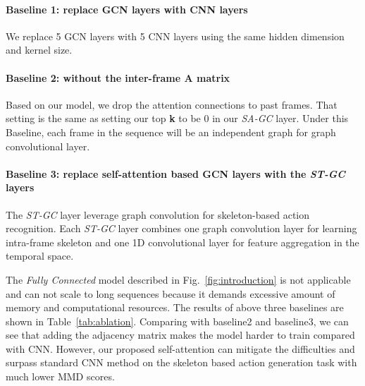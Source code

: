 \documentclass[runningheads]{llncs}
\begin{document}
\paragraph{Baseline 1: replace GCN layers with CNN layers}
We replace 5 GCN layers with 5 CNN layers using the same hidden dimension and kernel size. 

\paragraph{Baseline 2: without the inter-frame A matrix}
Based on our model, we drop the attention connections to past frames. That setting is the same as setting our top \textbf{k} to be 0 in our {\it SA-GC} layer. Under this Baseline, each frame in the sequence will be an independent graph for graph convolutional layer.  

\paragraph{Baseline 3: replace self-attention based GCN layers with the {\it ST-GC} layers \cite{yan2018spatial}}

The {\it ST-GC} layer leverage graph convolution for skeleton-based action recognition. Each {\it ST-GC} layer combines one graph convolution layer for learning intra-frame skeleton and one 1D convolutional layer for feature aggregation in the temporal space. 


The {\it Fully Connected} model described in Fig.~\ref{fig:introduction} is not applicable and can not scale to long sequences because it demands excessive amount of memory and computational resources.
The results of above three baselines are shown in Table~\ref{tab:ablation}. Comparing with baseline2 and baseline3, we can see that adding the adjacency matrix makes the model harder to train compared with CNN. However, our proposed self-attention can mitigate the difficulties and surpass standard CNN method on the skeleton based action generation task with much lower MMD scores.
\end{document}

